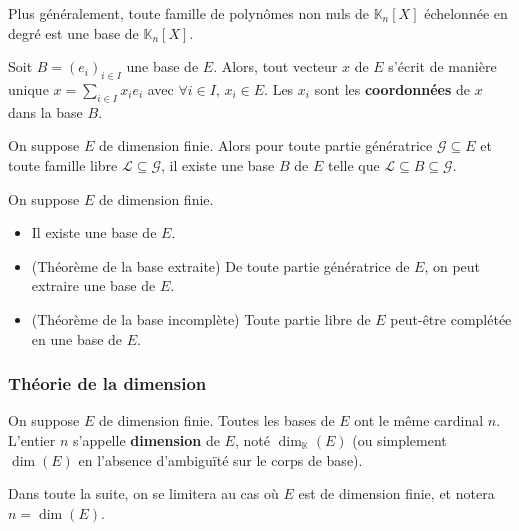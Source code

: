 
  \begin{proposition}
    Plus généralement, toute famille de polynômes non nuls de $\mathbb{K}_n[X]$ échelonnée en degré est une base de $\mathbb{K}_n[X]$.
  \end{proposition}


  \begin{proposition}
    Soit $B = (e_i)_{i \in I}$ une base de $E$. Alors, tout vecteur $x$ de $E$ s'écrit de manière unique $x = \sum_{i \in I} x_i e_i$ avec $\forall i \in I, \, x_i \in E$. Les $x_i$ sont les \textbf{coordonnées} de $x$ dans la base $B$.
  \end{proposition}

  \begin{theorem}
    On suppose $E$ de dimension finie. Alors pour toute partie génératrice $\mathcal{G} \subseteq E$ et toute famille libre $\mathcal{L} \subseteq \mathcal{G}$, il existe une base $B$ de $E$ telle que $\mathcal{L} \subseteq B \subseteq \mathcal{G}$.
  \end{theorem}

  \begin{corollary}
    On suppose $E$ de dimension finie.
    \begin{itemize}
      \item Il existe une base de $E$.
      \item (Théorème de la base extraite) De toute partie génératrice de $E$, on peut extraire une base de $E$.
      \item (Théorème de la base incomplète) Toute partie libre de $E$ peut-être complétée en une base de $E$.
    \end{itemize}
  \end{corollary}

  \subsubsection{Théorie de la dimension}

  \begin{theorem}
    On suppose $E$ de dimension finie. Toutes les bases de $E$ ont le même cardinal $n$. L'entier $n$ s'appelle \textbf{dimension} de $E$, noté $\dim_{\mathbb{K}}(E)$ (ou simplement $\dim(E)$ en l'absence d'ambiguïté sur le corps de base).
  \end{theorem}

  Dans toute la suite, on se limitera au cas où $E$ est de dimension finie, et notera $n = \dim(E)$.

